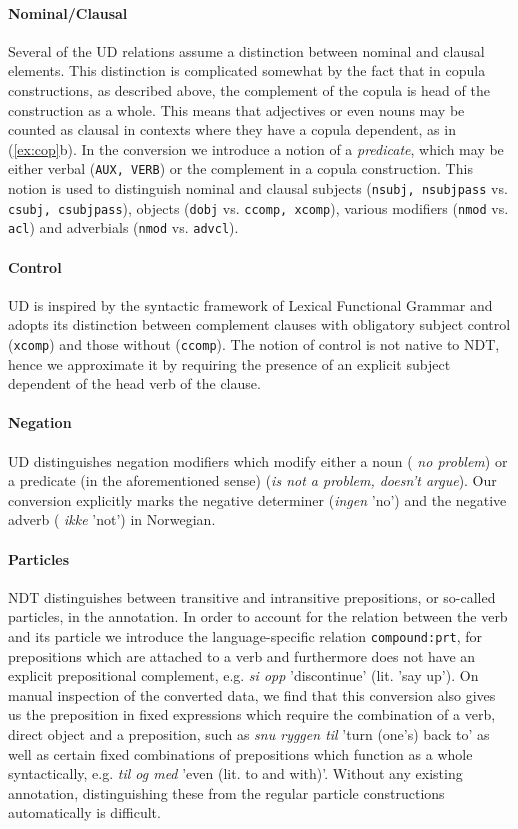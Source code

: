 \documentclass[10pt, a4paper]{article}
\begin{document}
\paragraph{Nominal/Clausal}Several of the UD relations assume a distinction between nominal and
clausal elements. This distinction is complicated somewhat by the fact
that in copula constructions, as described above, the complement of
the copula is head of the construction as a whole. This means that
adjectives or even nouns may be counted as clausal in contexts where
they have a copula dependent, as in (\ref{ex:cop}b).  In the
conversion we introduce a notion of a \emph{predicate}, which may be
either verbal ({\tt AUX, VERB}) or the complement in a copula
construction. This notion is used to distinguish nominal and clausal
subjects ({\tt nsubj, nsubjpass} vs. {\tt csubj, csubjpass}), objects
({\tt dobj} vs. {\tt ccomp, xcomp}), various modifiers ({\tt nmod}
vs. {\tt acl}) and adverbials ({\tt nmod} vs. {\tt advcl}).

\paragraph{Control}UD is inspired by the syntactic framework of Lexical Functional
Grammar \cite{Kap:Bre:82} and adopts its distinction between complement
clauses with obligatory subject control ({\tt xcomp}) and those without
({\tt ccomp}). The notion of control is not native to NDT, hence we
approximate it by requiring the presence of an explicit subject dependent of the
head verb of the clause.


\paragraph{Negation}UD distinguishes negation modifiers which modify either a noun ({\it
  no problem}) or a predicate (in the aforementioned sense) ({\it is
  not a problem, doesn't argue}). Our conversion explicitly marks the
negative determiner ({\it ingen} 'no') and the negative adverb ({\it
  ikke} 'not') in Norwegian.

\paragraph{Particles}NDT distinguishes between transitive and intransitive prepositions, or
so-called particles, in the annotation. In order to account for the
relation between the verb and its particle we introduce the
language-specific relation {\tt compound:prt}, for prepositions which
are attached to a verb and furthermore does not have an explicit prepositional complement,
e.g. {\it si opp} 'discontinue' (lit. 'say up').
On manual inspection of the
converted data, we find that this conversion also gives us the
preposition in fixed expressions which require the combination of a
verb, direct object and a preposition, such as {\it snu ryggen til}
'turn (one's) back to' as well as certain fixed combinations of
prepositions which function as a whole syntactically, e.g. {\it til og
  med} 'even (lit. to and with)'. Without any existing annotation,
distinguishing these from the regular particle constructions automatically is difficult.
\end{document}

